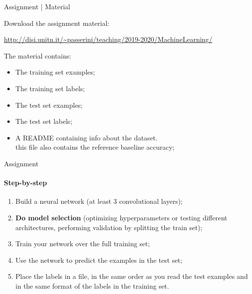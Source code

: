 \documentclass[10pt]{beamer}
\begin{document}
\begin{frame}{Assignment | Material}

Download the assignment material:

{\footnotesize \url{http://disi.unitn.it/~passerini/teaching/2019-2020/MachineLearning/}}

The material contains:
    \begin{itemize}
    \item The training set examples;
    \item The training set labels;
    \item The test set examples;
    \item The test set labels;
    \item A README containing info about the dataset. \\ this file also contains
          the reference baseline accuracy;
    \end{itemize}

\end{frame}


%
%
%
%
%


\begin{frame}{Assignment}
\framesubtitle{Step-by-step}


\begin{enumerate}
		\item Build a neural network (at least 3 convolutional layers);
\item {\bf Do model selection} (optimizing hyperparameters
		or testing different architectures, performing validation by splitting the train set);
\item Train your network over the full training set;
\item Use the network to predict the examples in the test set;
\item Place the labels in a file, in the same order as you read the test
      examples and in the same format of the labels in the training set.
\end{enumerate}

\end{frame}
\end{document}
